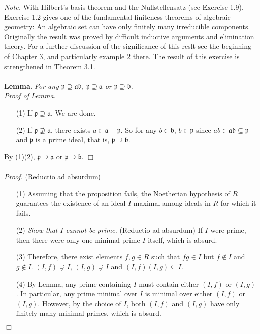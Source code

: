 \documentclass{article}
\begin{document}
\emph{Note.}
With Hilbert's basis theorem and the Nullstellensatz (see Exercise 1.9),
Exercise 1.2 gives one of the fundamental finiteness theorems of algebraic geometry:
An algebraic set can have only finitely many irreducible components.
Originally the result was proved by difficult inductive arguments and elimination theory.
For a further discussion of the significance of this reslt
see the beginning of Chapter 3, and particularly example 2 there.
The result of this exercise is strengthened in Theorem 3.1. \\\\



\textbf{Lemma.}
\emph{For any $\mathfrak{p} \supseteq \mathfrak{a} \mathfrak{b}$,
$\mathfrak{p} \supseteq \mathfrak{a}$ or $\mathfrak{p} \supseteq \mathfrak{b}$.} \\

\emph{Proof of Lemma.}
\begin{enumerate}
\item[(1)] If $\mathfrak{p} \supseteq \mathfrak{a}$. We are done.
\item[(2)] If $\mathfrak{p} \not\supseteq \mathfrak{a}$,
there exists $a \in \mathfrak{a} - \mathfrak{p}$.
So for any $b \in \mathfrak{b}$, $b \in \mathfrak{p}$
since $ab \in \mathfrak{ab} \subseteq \mathfrak{p}$ and $\mathfrak{p}$ is a prime ideal,
that is, $\mathfrak{p} \supseteq \mathfrak{b}$.
\end{enumerate}
By (1)(2), $\mathfrak{p} \supseteq \mathfrak{a}$ or $\mathfrak{p} \supseteq \mathfrak{b}$.
$\Box$ \\\\



\emph{Proof.}
(Reductio ad absurdum)
\begin{enumerate}
\item[(1)]
Assuming that the proposition fails, the Noetherian hypothesis of $R$
guarantees the existence of an ideal $I$ maximal among ideals in $R$ for which it fails.
\item[(2)]
\emph{Show that $I$ cannot be prime.}
(Reductio ad absurdum)
If $I$ were prime,
then there were only one minimal prime $I$ itself, which is absurd.
\item[(3)]
Therefore, there exist elements $f, g \in R$ such that $fg \in I$
but $f \not\in I$ and $g \not\in I$.
$(I,f) \supsetneq I$, $(I,g) \supsetneq I$ and $(I,f)(I,g) \subseteq I$.
\item[(4)]
By Lemma, any prime containing $I$ must contain either $(I,f)$ or $(I,g)$.
In particular, any prime minimal over $I$ is minimal over either $(I,f)$ or $(I,g)$.
However, by the choice of $I$,
both $(I,f)$ and $(I,g)$ have only finitely many minimal primes,
which is absurd.
\end{enumerate}
$\Box$ \\\\
\end{document}
